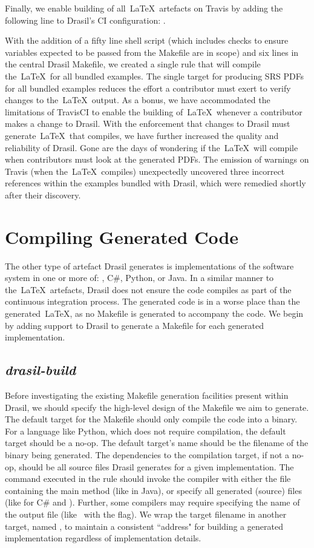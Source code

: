 {{{{{Finally, we enable building of all\ \LaTeX\ artefacts on Travis by adding the following line to Drasil's CI configuration: .

With the addition of a fifty line shell script (which includes checks to ensure variables expected to be passed from the Makefile are in scope) and six lines in the central Drasil Makefile, we created a single rule that will compile the\ \LaTeX\ for all bundled examples. The single target for producing SRS PDFs for all bundled examples reduces the effort a contributor must exert to verify changes to the\ \LaTeX\ output. As a bonus, we have accommodated the limitations of TravisCI to enable the building of\ \LaTeX\ whenever a contributor makes a change to Drasil. With the enforcement that changes to Drasil must generate\ \LaTeX\ that compiles, we have further increased the quality and reliability of Drasil. Gone are the days of wondering if the\ \LaTeX\ will compile when contributors must look at the generated PDFs. The emission of warnings on Travis (when the\ \LaTeX\ compiles) unexpectedly uncovered three incorrect references within the examples bundled with Drasil, which were remedied shortly after their discovery.


\section{Compiling Generated Code}\label{bsCode}

The other type of artefact Drasil generates is implementations of the software system in one or more of: \CC, C\#, Python, or Java. In a similar manner to the\ \LaTeX\ artefacts, Drasil does not ensure the code compiles as part of the continuous integration process. The generated code is in a worse place than the generated\ \LaTeX, as no Makefile is generated to accompany the code. We begin by adding support to Drasil to generate a Makefile for each generated implementation.

\subsection{\textit{drasil-build}}\label{bsDrasilBuild}

Before investigating the existing Makefile generation facilities present within Drasil, we should specify the high-level design of the Makefile we aim to generate. The default target for the Makefile should only compile the code into a binary. For a language like Python, which does not require compilation, the default target should be a no-op. The default target's name should be the filename of the binary being generated. The dependencies to the compilation target, if not a no-op, should be all source files Drasil generates for a given implementation. The command executed in the rule should invoke the compiler with either the file containing the main method (like in Java), or specify all generated (source) files (like for C\# and \CC). Further, some compilers may require specifying the name of the output file (like \CC~with the  flag). We wrap the target filename in another target, named , to maintain a consistent ``address" for building a generated implementation regardless of implementation details.

}}}}}
